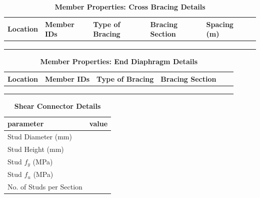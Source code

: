 \documentclass[12pt,a4paper]{report}
\numberwithin{table}{chapter}
\numberwithin{figure}{chapter}
\begin{document}
\newpage

\vspace{0.4em}
\setlength{\tabcolsep}{4pt}
\setlength\LTleft{0pt}
\setlength\LTright{\fill}

\begin{longtable}{|L{2.2cm}|L{2.2cm}|L{3.0cm}|L{2.5cm}|C{1.8cm}|C{1.8cm}|}
\caption{\textbf{Member Properties: Cross Bracing Details}}
\hline
\textbf{Location} & \textbf{Member IDs} & \textbf{Type of Bracing} & \textbf{Bracing Section} & \textbf{Spacing (m)} \\
\hline
 &  &  &  &  \\[6pt]
\hline
 &  &  &  &  \\[6pt]
\hline
 &  &  &  &  \\[6pt]
\hline
\end{longtable}

\vspace{0.4em}
\noindent
\setlength{\tabcolsep}{4pt}
\setlength\LTleft{0pt}
\setlength\LTright{\fill}

\begin{longtable}{|L{2.2cm}|L{2.2cm}|L{3.0cm}|L{2.5cm}|C{1.8cm}|C{1.8cm}|}
\caption{\textbf{Member Properties: End Diaphragm Details}}
\hline
\textbf{Location} & \textbf{Member IDs} & \textbf{Type of Bracing} & \textbf{Bracing Section} \\
\hline
 &  &  &  \\[6pt]
\hline
 &  &  &  \\[6pt]
\hline
 &  &  &  \\[6pt]
\hline
\end{longtable}



\label{subsec:shear-connectors}

\vspace{2.2em}

\vspace{0.4em}
\begin{longtable}{|L{5.5cm}|p{10.0cm}|}
\caption{\textbf{Shear Connector Details}}
\hline
\textbf{parameter} & \textbf{value} \\
\hline
\textnormal{Stud Diameter (mm)} &  \\[6pt]
\hline
\textnormal{Stud Height (mm)} &  \\[6pt]
\hline
\textnormal{Stud $f_y$ (MPa)} &  \\[6pt]
\hline
\textnormal{Stud $f_u$ (MPa)} &  \\[6pt]
\hline
\textnormal{No. of Studs per Section} &  \\[6pt]
\hline
\end{longtable}
\end{document}
